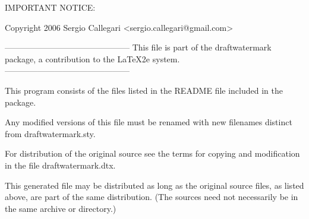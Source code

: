 

\keepsilent

\preamble

  IMPORTANT NOTICE:

Copyright 2006
Sergio Callegari <sergio.callegari@gmail.com>

---------------------------------------------
This file is part of the draftwatermark package,
a contribution to the LaTeX2e system.
---------------------------------------------

This program consists of the files listed in the README file included
in the package.

Any modified versions of this file must be renamed with new filenames
distinct from draftwatermark.sty.

For distribution of the original source see the terms
for copying and modification in the file draftwatermark.dtx.

This generated file may be distributed as long as the
original source files, as listed above, are part of the
same distribution. (The sources need not necessarily be
in the same archive or directory.)

\endpreamble


\preamble
\endpreamble



